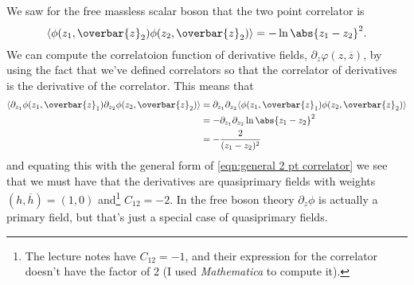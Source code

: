 \documentclass[fleqn]{NotesClass}
\DeclarePairedDelimiter{\correlator}{\langle}{\rangle}
\begin{document}
    \begin{exm}{}{}
        We saw for the free massless scalar boson that the two point correlator is
        \begin{equation}
            \correlator{\phi(z_1, \overbar{z}_2) \phi(z_2, \overbar{z}_2)} = -\ln\abs{z_1 - z_2}^2.
        \end{equation}
        We can compute the correlatoion function of derivative fields, \(\partial_z \varphi(z, \overbar{z})\), by using the fact that we've defined correlators so that the correlator of derivatives is the derivative of the correlator.
        This means that
        \begin{align}
            \correlator{\partial_{z_1}\phi(z_1, \overbar{z}_1) \partial_{z_2}\phi(z_2, \overbar{z}_2)} &= \partial_{z_1}\partial_{z_2}\correlator{\phi(z_1, \overbar{z}_1) \phi(z_2, \overbar{z}_2)}\\
            &= -\partial_{z_1}\partial_{z_2}\ln\abs{z_1 - z_2}^2\\
            &= -\frac{2}{(z_1 - z_2)^2}
        \end{align}
        and equating this with the general form of \cref{eqn:general 2 pt correlator} we see that we must have that the derivatives are quasiprimary fields with weights \((h, \overbar{h}) = (1, 0)\) and\footnote{\color{red}The lecture notes have \(C_{12} = -1\), and their expression for the correlator doesn't have the factor of 2 (I used \textit{Mathematica} to compute it).} \(C_{12} = -2\).
        In the free boson theory \(\partial_z\phi\) is actually a primary field, but that's just a special case of quasiprimary fields.
    \end{exm}
    
\end{document}
